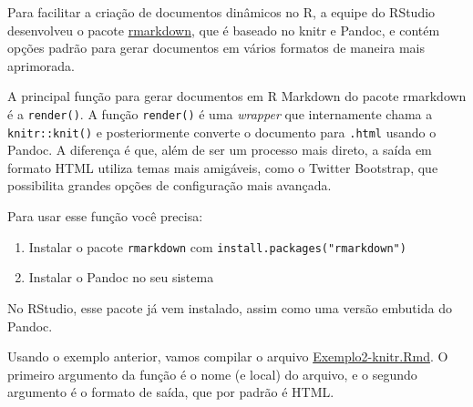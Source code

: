 \documentclass[10pt,a4paper]{book}
\providecommand{\tightlist}{%
  \setlength{\itemsep}{0pt}\setlength{\parskip}{0pt}}
\begin{document}
Para facilitar a criação de documentos dinâmicos no R, a equipe do
RStudio desenvolveu o pacote
\href{http://rmarkdown.rstudio.com}{rmarkdown}, que é baseado no knitr e
Pandoc, e contém opções padrão para gerar documentos em vários formatos
de maneira mais aprimorada.

A principal função para gerar documentos em R Markdown do pacote
rmarkdown é a \texttt{render()}. A função \texttt{render()} é uma
\emph{wrapper} que internamente chama a \texttt{knitr::knit()} e
posteriormente converte o documento para \texttt{.html} usando o Pandoc.
A diferença é que, além de ser um processo mais direto, a saída em
formato HTML utiliza temas mais amigáveis, como o Twitter Bootstrap, que
possibilita grandes opções de configuração mais avançada.

Para usar esse função você precisa:

\begin{enumerate}
\def\labelenumi{\arabic{enumi}.}
\tightlist
\item
  Instalar o pacote \texttt{rmarkdown} com
  \texttt{install.packages("rmarkdown")}
\item
  Instalar o Pandoc no seu sistema
\end{enumerate}

No RStudio, esse pacote já vem instalado, assim como uma versão embutida
do Pandoc.

Usando o exemplo anterior, vamos compilar o arquivo
\href{exemplos/Exemplo2-knitr.Rmd}{Exemplo2-knitr.Rmd}. O primeiro
argumento da função é o nome (e local) do arquivo, e o segundo argumento
é o formato de saída, que por padrão é HTML.
\end{document}
